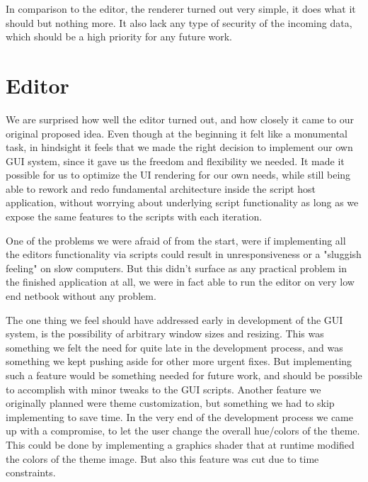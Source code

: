In comparison to the editor, the renderer turned out very simple, it does what it should but nothing more. It also lack any type of security of the incoming data, which should be a high priority for any future work.

\section{Editor}
We are surprised how well the editor turned out, and how closely it came to our original proposed idea. Even though at the beginning it felt like a monumental task, in hindsight it feels that we made the right decision to implement our own GUI system, since it gave us the freedom and flexibility we needed. It made it possible for us to optimize the UI rendering for our own needs, while still being able to rework and redo fundamental architecture inside the script host application, without worrying about underlying script functionality as long as we expose the same features to the scripts with each iteration.

One of the problems we were afraid of from the start, were if implementing all the editors functionality via scripts could result in unresponsiveness or a "sluggish feeling" on slow computers. But this didn't surface as any practical problem in the finished application at all, we were in fact able to run the editor on very low end netbook without any problem.

The one thing we feel should have addressed early in development of the GUI system, is the possibility of arbitrary window sizes and resizing. This was something we felt the need for quite late in the development process, and was something we kept pushing aside for other more urgent fixes. But implementing such a feature would be something needed for future work, and should be possible to accomplish with minor tweaks to the GUI scripts. Another feature we originally planned were theme customization, but something we had to skip implementing to save time. In the very end of the development process we came up with a compromise, to let the user change the overall hue/colors of the theme. This could be done by implementing a graphics shader that at runtime modified the colors of the theme image. But also this feature was cut due to time constraints. 



